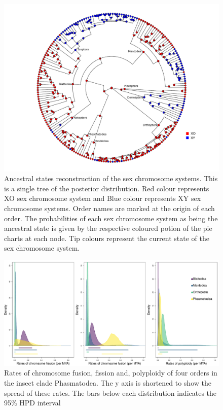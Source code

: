 \newpage
\begin{figure}
\centering \includegraphics[width=1\textwidth]{figures/sex_chrom_asr_phylogeny.pdf}
\caption{Ancestral states reconstruction of the sex chromosome systems. This is a single tree of the posterior distribution. Red colour represents XO sex chromosome system and Blue colour represents XY sex chromosome systems. Order names are marked at the origin of each order. The probabilities of each sex chromosome system as being the ancestral state is given by the respective coloured potion of the pie charts at each node. Tip colours represent the current state of the sex chromosome system.}
\label{fig:sex.asr.plot}
\end{figure}

\newpage
\begin{figure}
\centering \includegraphics[width=.7\textwidth]{figures/order_rates_95HPD.pdf}
\caption{Rates of chromosome fusion, fission and, polyploidy of four orders in the insect clade Phasmatodea. The y axis is shortened to show the spread of these rates. The bars below each distribution indicates the 95\% HPD interval}
\label{fig:order.rates.95HPD}
\end{figure}

